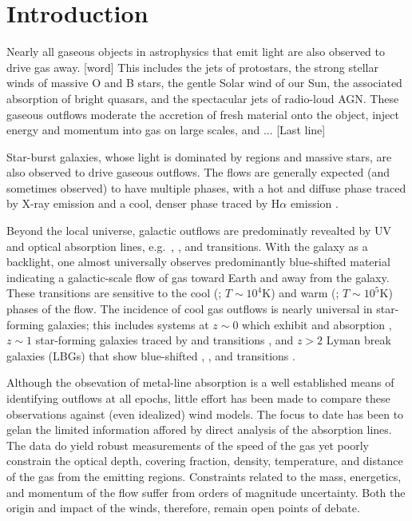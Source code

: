 \documentclass[12pt,preprint]{aastex}
\begin{document}

\section{Introduction}

Nearly all gaseous objects in astrophysics that emit light are also
observed to drive gas away.  [word] This includes the jets of protostars, the
strong stellar winds of massive O and B stars, the gentle Solar wind
of our Sun, the associated absorption of bright quasars, and the
spectacular jets of radio-loud AGN.   These gaseous outflows moderate
the accretion of fresh material onto the object, inject energy and
momentum into gas on large scales, and ...
[Last line]

Star-burst galaxies, whose light is dominated by  regions
and massive stars, are also observed to drive gaseous outflows.  The
flows are generally expected (and sometimes observed) to have multiple
phases, with a hot and diffuse phase traced by X-ray emission
\citep[e.g.][]{strickland,martin+k} and a cool, denser phase traced by
H$\alpha$ emission \citep[e.g.][]{NGC891,M87}.  

Beyond the local universe, galactic outflows are predominatly
revealted by UV and optical absorption lines, e.g.\ ,
,  and  transitions.  With the galaxy
as a backlight, one almost universally observes predominantly
blue-shifted material indicating a galactic-scale flow of gas toward
Earth and away from the galaxy.  These transitions are sensitive to
the cool (; $T \sim 10^4$K) and warm (; $T \sim
10^5$K) phases of the flow.  The incidence of cool gas outflows is
nearly universal in star-forming galaxies;  this includes systems at $z \sim 0$
which exhibit  and  absorption
\citep{rupke,martin,student}, $z \sim 1$ star-forming galaxies traced by
 and  transitions \citep{wcp+09,rubin+10}, and
$z>2$ Lyman break galaxies (LBGs) that show blue-shifted ,
, and  transitions \citep{lowenthal,steidel94}.

Although the obsevation of metal-line absorption is a well established
means of identifying outflows at all epochs, little effort has been
made to compare these observations against (even idealized) wind
models.  The focus to date has been to gelan the limited information
affored by direct analysis of the absorption lines.  The data do yield
robust measurements of the speed of the gas yet poorly constrain the
optical depth, covering fraction, density, temperature, and distance
of the gas from the emitting regions.  Constraints related to the
mass, energetics, and momentum of the flow suffer from
orders of magnitude uncertainty.  Both the origin and impact of the
winds, therefore, remain open points of debate.
\end{document}
